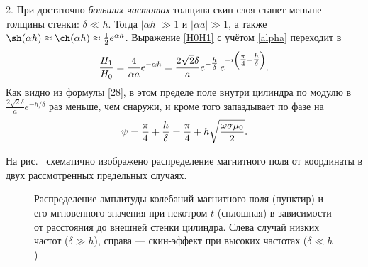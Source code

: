 2. При достаточно \emph{больших частотах} толщина скин-слоя станет меньше толщины стенки:
$\delta \ll h$. Тогда $|\alpha h| \gg 1$ и $|\alpha a| \gg 1$, а
также $\sh(\alpha h)\approx\ch(\alpha h)\approx\frac12e^{\alpha h}$.
Выражение \eqref{H0H1} с учётом \eqref{alpha} переходит в
\begin{equation} \eqmark{28}
\frac{H_1}{H_0}= \frac{4}{\alpha a} e^{-\alpha h}
= \frac{2\sqrt{2}\delta}{a}e^{-\tfrac{h}{\delta}}\,e^{-i\left(\tfrac{\pi}{4}+\tfrac{h}{\delta}\right)}.
\end{equation}
Как видно из формулы \eqref{28}, в этом пределе поле внутри цилиндра по модулю в
$\frac{2\sqrt{2}\delta}{a}e^{-h/\delta}$ раз меньше, чем снаружи, и
кроме того запаздывает по фазе на
\begin{equation} \eqmark{29}
\psi=\frac{\pi}{4}+\frac{h}{\delta}=
\frac{\pi}{4}+h\sqrt{\frac{\omega\sigma\mu_0}{2}}.
\end{equation}

На рис.~ схематично изображено распределение магнитного 
поля от координаты в двух рассмотренных предельных случаях.

\begin{figure}
    \centering
    \par
    \caption{Распределение амплитуды колебаний магнитного поля (пунктир)
        и его мгновенного значения при некотром $t$ (сплошная) в зависимости 
        от расстояния до внешней стенки цилиндра. 
        Слева случай низких частот ($\delta \gg h$), справа --- скин-эффект
        при высоких частотах ($\delta \ll h$)}
\end{figure}





